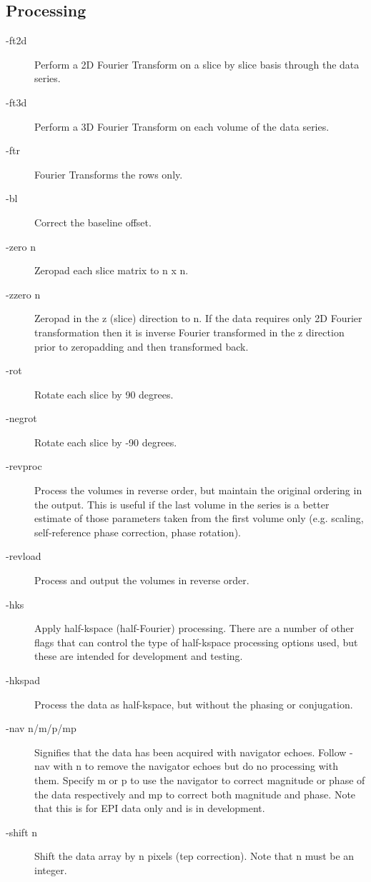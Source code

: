\documentclass[12pt, a4paper]{article}
\begin{document}
\subsection*{Processing}
\begin{description}
\item[-ft2d] Perform a 2D Fourier Transform on a slice by slice basis
  through the data series.
\item[-ft3d] Perform a 3D Fourier Transform on each volume of the data
  series.
\item[-ftr] Fourier Transforms the rows only.
\item[-bl] Correct the baseline offset.
\item[-zero n] Zeropad each slice matrix to n x n.
\item[-zzero n] Zeropad in the z (slice) direction to n.  If the data
  requires only 2D Fourier transformation then it is inverse Fourier
  transformed in the z direction prior to zeropadding and then
  transformed back.
\item[-rot] Rotate each slice by 90 degrees.
\item[-negrot] Rotate each slice by -90 degrees.
\item[-revproc] Process the volumes in reverse order, but maintain the
  original ordering in the output.  This is useful if the last volume
  in the series is a better estimate of those parameters taken from
  the first volume only (e.g. scaling, self-reference phase
  correction, phase rotation).
\item[-revload] Process and output the volumes in reverse order.
\item[-hks] Apply half-kspace (half-Fourier) processing.  There are a
  number of other flags that can control the type of half-kspace
  processing options used, but these are intended for development and
  testing.
\item[-hkspad] Process the data as half-kspace, but without the
  phasing or conjugation.
\item[-nav n/m/p/mp] Signifies that the data has been acquired with
  navigator echoes.  Follow -nav with n to remove the navigator echoes
  but do no processing with them.  Specify m or p to use the navigator
  to correct magnitude or phase of the data respectively and mp to
  correct both magnitude and phase.  Note that this is for EPI data
  only and is in development.
\item[-shift n] Shift the data array by n pixels (tep correction).
  Note that n must be an integer.

\end{description}
\end{document}
